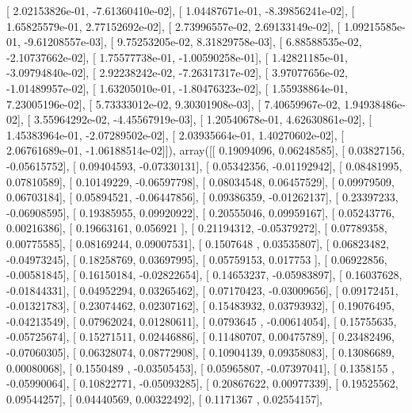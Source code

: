 \documentclass{article}
\begin{document}
       [  2.02153826e-01,  -7.61360410e-02],
       [  1.04487671e-01,  -8.39856241e-02],
       [  1.65825579e-01,   2.77152692e-02],
       [  2.73996557e-02,   2.69133149e-02],
       [  1.09215585e-01,  -9.61208557e-03],
       [  9.75253205e-02,   8.31829758e-03],
       [  6.88588535e-02,  -2.10737662e-02],
       [  1.75577738e-01,  -1.00590258e-01],
       [  1.42821185e-01,  -3.09794840e-02],
       [  2.92238242e-02,  -7.26317317e-02],
       [  3.97077656e-02,  -1.01489957e-02],
       [  1.63205010e-01,  -1.80476323e-02],
       [  1.55938864e-01,   7.23005196e-02],
       [  5.73333012e-02,   9.30301908e-03],
       [  7.40659967e-02,   1.94938486e-02],
       [  3.55964292e-02,  -4.45567919e-03],
       [  1.20540678e-01,   4.62630861e-02],
       [  1.45383964e-01,  -2.07289502e-02],
       [  2.03935664e-01,   1.40270602e-02],
       [  2.06761689e-01,  -1.06188514e-02]]), array([[ 0.19094096,  0.06248585],
       [ 0.03827156, -0.05615752],
       [ 0.09404593, -0.07330131],
       [ 0.05342356, -0.01192942],
       [ 0.08481995,  0.07810589],
       [ 0.10149229, -0.06597798],
       [ 0.08034548,  0.06457529],
       [ 0.09979509,  0.06703184],
       [ 0.05894521, -0.06447856],
       [ 0.09386359, -0.01262137],
       [ 0.23397233, -0.06908595],
       [ 0.19385955,  0.09920922],
       [ 0.20555046,  0.09959167],
       [ 0.05243776,  0.00216386],
       [ 0.19663161,  0.056921  ],
       [ 0.21194312, -0.05379272],
       [ 0.07789358,  0.00775585],
       [ 0.08169244,  0.09007531],
       [ 0.1507648 ,  0.03535807],
       [ 0.06823482, -0.04973245],
       [ 0.18258769,  0.03697995],
       [ 0.05759153,  0.017753  ],
       [ 0.06922856, -0.00581845],
       [ 0.16150184, -0.02822654],
       [ 0.14653237, -0.05983897],
       [ 0.16037628, -0.01844331],
       [ 0.04952294,  0.03265462],
       [ 0.07170423, -0.03009656],
       [ 0.09172451, -0.01321783],
       [ 0.23074462,  0.02307162],
       [ 0.15483932,  0.03793932],
       [ 0.19076495, -0.04213549],
       [ 0.07962024,  0.01280611],
       [ 0.0793645 , -0.00614054],
       [ 0.15755635, -0.05725674],
       [ 0.15271511,  0.02446886],
       [ 0.11480707,  0.00475789],
       [ 0.23482496, -0.07060305],
       [ 0.06328074,  0.08772908],
       [ 0.10904139,  0.09358083],
       [ 0.13086689,  0.00080068],
       [ 0.1550489 , -0.03505453],
       [ 0.05965807, -0.07397041],
       [ 0.1358155 , -0.05990064],
       [ 0.10822771, -0.05093285],
       [ 0.20867622,  0.00977339],
       [ 0.19525562,  0.09544257],
       [ 0.04440569,  0.00322492],
       [ 0.1171367 ,  0.02554157],
\end{document}
